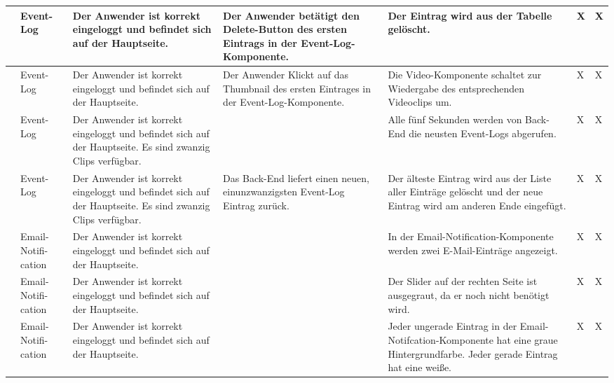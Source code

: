 \begin{longtable}{| p{} | p{} | p{} | p{} | p{} | p{} | p{} |}
	\stepcounter{TestNumber}\arabic{TestNumber} & Event-Log & Der Anwender ist korrekt eingeloggt und befindet sich auf der Hauptseite. & Der Anwender betätigt den Delete-Button des ersten Eintrags in der Event-Log-Komponente. & Der Eintrag wird aus der Tabelle gelöscht. & X & X \\ \hline
	
	\stepcounter{TestNumber}\arabic{TestNumber} & Event-Log & Der Anwender ist korrekt eingeloggt und befindet sich auf der Hauptseite. & Der Anwender Klickt auf das Thumbnail des ersten Eintrages in der Event-Log-Komponente. & Die Video-Komponente schaltet zur Wiedergabe des entsprechenden Videoclips um. & X & X \\ \hline
	
	\stepcounter{TestNumber}\arabic{TestNumber} & Event-Log & Der Anwender ist korrekt eingeloggt und befindet sich auf der Hauptseite. Es sind zwanzig Clips verfügbar. & & Alle fünf Sekunden werden von Back-End die neusten Event-Logs abgerufen. & X & X \\ \hline
	
	\stepcounter{TestNumber}\arabic{TestNumber} & Event-Log & Der Anwender ist korrekt eingeloggt und befindet sich auf der Hauptseite. Es sind zwanzig Clips verfügbar. & Das Back-End liefert einen neuen, einunzwanzigsten Event-Log Eintrag zurück. & Der älteste Eintrag wird aus der Liste aller Einträge gelöscht und der neue Eintrag wird am anderen Ende eingefügt. & X & X \\ \hline
	
	\stepcounter{TestNumber}\arabic{TestNumber} & Email-Notifi-cation & Der Anwender ist korrekt eingeloggt und befindet sich auf der Hauptseite. & & In der Email-Notification-Komponente werden zwei E-Mail-Einträge angezeigt. & X & X \\ \hline
	
	\stepcounter{TestNumber}\arabic{TestNumber} & Email-Notifi-cation & Der Anwender ist korrekt eingeloggt und befindet sich auf der Hauptseite. & & Der Slider auf der rechten Seite ist ausgegraut, da er noch nicht benötigt wird. & X & X \\ \hline
	
	\stepcounter{TestNumber}\arabic{TestNumber} & Email-Notifi-cation & Der Anwender ist korrekt eingeloggt und befindet sich auf der Hauptseite. & & Jeder ungerade Eintrag in der Email-Notifcation-Komponente hat eine graue Hintergrundfarbe. Jeder gerade Eintrag hat eine weiße.  & X & X \\ \hline
	

\end{longtable}
